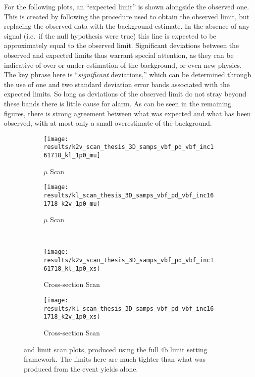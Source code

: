     For the following plots, an ``expected limit'' is shown alongside the observed one.
    This is created by following the procedure used to obtain the observed limit,
        but replacing the observed data with the background estimate.
    In the absence of any signal (i.e.\ if the null hypothesis were true)
        this line is expected to be approximately equal to the observed limit.
    Significant deviations between the observed and expected limits thus warrant special attention,
        as they can be indicative of over or under-estimation of the background,
        or even new physics.
    The key phrase here is ``\textit{significant} deviations,'' which can be determined through
        the use of one and two standard deviation error bands associated with the expected limits.
    So long as deviations of the observed limit do not stray beyond these bands
        there is little cause for alarm.
    As can be seen in the remaining figures, there is strong agreement between what was expected
        and what has been observed, with at most only a small overestimate of the background.


    \begin{figure}
        \centering
        \begin{subfigure}{0.48\textwidth} 
            \texttt{[image: results/k2v\_scan\_thesis\_3D\_samps\_vbf\_pd\_vbf\_inc161718\_kl\_1p0\_mu]}
            \caption{\kvv $\mu$ Scan}
            \label{fig:mulimits_kvv_rooFit}
        \end{subfigure}
        \begin{subfigure}{0.48\textwidth}
            \texttt{[image: results/kl\_scan\_thesis\_3D\_samps\_vbf\_pd\_vbf\_inc161718\_k2v\_1p0\_mu]}
            \caption{\kl $\mu$ Scan}
            \label{fig:mulimits_kl_rooFit}
        \end{subfigure}\\
        \begin{subfigure}{0.48\textwidth} 
            \texttt{[image: results/k2v\_scan\_thesis\_3D\_samps\_vbf\_pd\_vbf\_inc161718\_kl\_1p0\_xs]}
            \caption{\kvv Cross-section Scan}
            \label{fig:xseclimits_kvv_rooFit}
        \end{subfigure}
        \begin{subfigure}{0.48\textwidth}
            \texttt{[image: results/kl\_scan\_thesis\_3D\_samps\_vbf\_pd\_vbf\_inc161718\_k2v\_1p0\_xs]}
            \caption{\kl Cross-section Scan}
            \label{fig:xseclimits_kl_rooFit}
        \end{subfigure}
        \caption{
            \kvv and \kl limit scan plots, produced using the full 4b limit setting framework.
            The limits here are much tighter than what was produced from the event yields alone.
        }
    \end{figure}


